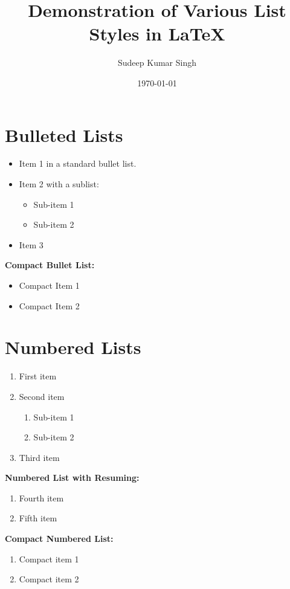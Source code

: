 \documentclass[12pt, a4paper]{article}
\title{\textbf{Demonstration of Various List Styles in LaTeX}}
\author{Sudeep Kumar Singh}
\date{\today}
\begin{document}
\maketitle

\section*{Bulleted Lists}

\begin{itemize}
    \item Item 1 in a standard bullet list.
    \item Item 2 with a sublist:
    \begin{itemize}
        \item Sub-item 1
        \item Sub-item 2
    \end{itemize}
    \item Item 3
\end{itemize}

\textbf{Compact Bullet List:}
\begin{itemize}[noitemsep, topsep=0pt] %
    \item Compact Item 1
    \item Compact Item 2
\end{itemize}

\section*{Numbered Lists}

\begin{enumerate}
    \item First item
    \item Second item
    \begin{enumerate}
        \item Sub-item 1
        \item Sub-item 2
    \end{enumerate}
    \item Third item
\end{enumerate}

\textbf{Numbered List with Resuming:}
\begin{enumerate}
    \item Fourth item
    \item Fifth item
\end{enumerate}

\textbf{Compact Numbered List:}
\begin{enumerate}[noitemsep, topsep=0pt, label=\arabic*)] %
    \item Compact item 1
    \item Compact item 2
\end{enumerate}
\end{document}
